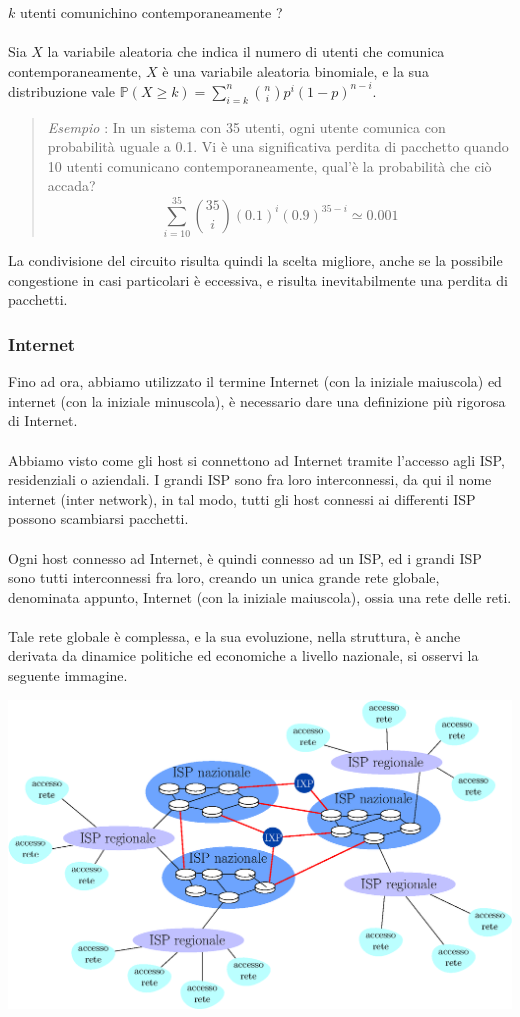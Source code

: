 \documentclass[12pt, letterpaper]{article}
\newcommand{\acc}{\\\hphantom{}\\}
\begin{document}
$k$ utenti comunichino contemporaneamente ?\acc  Sia $X$ la variabile aleatoria che indica il numero di utenti che comunica 
contemporaneamente, $X$ è una variabile aleatoria binomiale, e la sua distribuzione vale
 $\displaystyle\mathbb{P}(X\ge k)=\sum_{i=k}^n\binom{n}{i}p^i(1-p)^{n-i}$.\begin{quote}
 \color{gray} \textit{Esempio} : In un sistema con 35 utenti, ogni utente comunica con probabilità uguale a 0.1. 
 Vi è una significativa perdita di pacchetto quando 10 utenti comunicano contemporaneamente, qual'è la probabilità che 
 ciò accada? $$\sum_{i=10}^{35}\binom{35}{i}(0.1)^i(0.9)^{35-i}\simeq0.001$$
 \color{black}
\end{quote}
La condivisione del circuito risulta quindi la scelta migliore, anche se la possibile congestione in casi particolari 
è eccessiva, e risulta inevitabilmente una perdita di pacchetti.\subsubsection{Internet}
Fino ad ora, abbiamo utilizzato il termine Internet (con la iniziale maiuscola) ed internet (con la iniziale minuscola), è necessario 
dare una definizione più rigorosa di Internet.\acc 
Abbiamo visto come gli host si connettono ad Internet tramite l'accesso agli ISP, residenziali o aziendali. I grandi ISP sono fra 
loro interconnessi, da qui il nome internet (inter network), in tal modo, tutti gli host connessi ai differenti ISP possono 
scambiarsi pacchetti.\acc Ogni host connesso ad Internet, è quindi connesso ad un ISP, ed i grandi ISP sono tutti interconnessi fra loro, 
creando un unica grande rete globale, denominata appunto, Internet (con la iniziale maiuscola), ossia una rete delle reti.\acc 
Tale rete globale è complessa, e la sua evoluzione, nella struttura, è anche derivata da dinamice politiche ed economiche a livello 
nazionale, si osservi la seguente immagine.\begin{center}
    \includegraphics[width=1\textwidth ]{images/Internet.eps}
\end{center}
\end{document}
